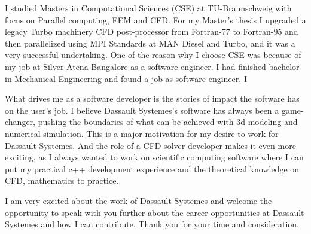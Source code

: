 \documentclass[11pt, a4paper]{awesome-cv}
\newcommand{\company}{Dassault Systemes}
\begin{document}
\begin{cvletter}
I studied Masters in Computational Sciences (CSE) at TU-Braunschweig with focus 
on Parallel computing, FEM and CFD. For my Master's thesis I upgraded a legacy 
Turbo machinery CFD post-processor from Fortran-77 to Fortran-95 and then 
parallelized using MPI Standards at MAN Diesel and Turbo, and it was a very 
successful undertaking. One of the reason why I choose CSE was because of my job
 at Silver-Atena Bangalore as a software engineer. I had finished bachelor in 
 Mechanical Engineering and found a job as software engineer. I  

What drives me as a software developer is the stories of impact the software has
 on the user's job. I believe \company{}'s software has always been a 
 game-changer, pushing the boundaries of what can be achieved with 3d modeling 
and numerical simulation. This is a major motivation for my desire to work for 
\company{}. And the role of a CFD solver developer makes it even more exciting, 
as I always wanted to work on scientific computing software where I can put my 
practical c++ development experience and the theoretical knowledge on CFD, 
mathematics to practice.


I am very excited about the work of \company{} and welcome the opportunity to 
speak with you further about the career opportunities at \company{} and how I 
can contribute. Thank you for your time and consideration. 

 
\end{cvletter}


\makeletterclosing
\end{document}
